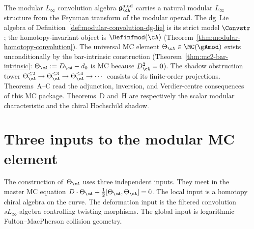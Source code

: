 \smallskip\noindent
The modular $L_\infty$ convolution algebra
$\mathfrak{g}^{\mathrm{mod}}_\cA$ carries a natural modular $L_\infty$
structure from the Feynman transform of the modular operad. The dg~Lie
algebra of Definition~\ref{def:modular-convolution-dg-lie} is its strict
model $\Convstr$; the homotopy-invariant object is $\Definfmod(\cA)$
(Theorem~\ref{thm:modular-homotopy-convolution}). The universal MC element
$\Theta_\cA \in \MC(\gAmod)$ exists unconditionally by the bar-intrinsic
construction (Theorem~\ref{thm:mc2-bar-intrinsic}: $\Theta_\cA := D_\cA - d_0$
is MC because $D_\cA^2 = 0$). The shadow obstruction tower
$\Theta_\cA^{\le 2} \to \Theta_\cA^{\le 3} \to \Theta_\cA^{\le 4}
\to \cdots$ consists of its finite-order projections.
Theorems~A--C read the adjunction, inversion, and Verdier-centre
consequences of this MC package. Theorems~D and~H are respectively
the scalar modular characteristic and the chiral Hochschild shadow.


\section{Three inputs to the modular MC element}
\label{sec:outlook-three-pillars}

The construction of~$\Theta_\cA$ uses three independent inputs.
They meet in the master MC equation
$D\cdot\Theta_\cA + \tfrac{1}{2}[\Theta_\cA,\Theta_\cA] = 0$.
The local input is a homotopy chiral algebra on the curve. The
deformation input is the filtered convolution $sL_\infty$-algebra
controlling twisting morphisms. The global input is logarithmic
Fulton--MacPherson collision geometry.


